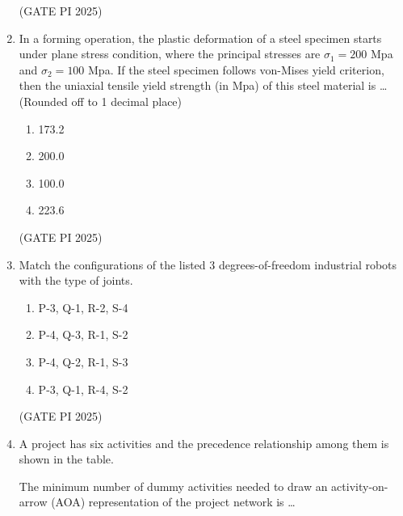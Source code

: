 \documentclass[journal,12pt,onecolumn]{IEEEtran}
\theoremstyle{remark}
\begin{document}
\begin{enumerate}
\hfill (GATE PI 2025)

\item In a forming operation, the plastic deformation of a steel specimen starts under plane stress condition, where the principal stresses are $\sigma_1=200$ Mpa and $\sigma_2=100$ Mpa. If the steel specimen follows von-Mises yield criterion, then the uniaxial tensile yield strength (in Mpa) of this steel material is \dots (Rounded off to 1 decimal place)

\begin{multicols}{4}
\begin{enumerate}
\item 173.2
\item 200.0
\item 100.0
\item 223.6
\end{enumerate}
\end{multicols}

\hfill (GATE PI 2025)

\item Match the configurations of the listed 3 degrees-of-freedom industrial robots with the type of joints.



\begin{enumerate}
\item P-3, Q-1, R-2, S-4
\item P-4, Q-3, R-1, S-2
\item P-4, Q-2, R-1, S-3
\item P-3, Q-1, R-4, S-2
\end{enumerate}


\hfill (GATE PI 2025)

\item A project has six activities and the precedence relationship among them is shown in the table.


 The minimum number of dummy activities needed to draw an activity-on-arrow (AOA) representation of the project network is \dots

\begin{enumerate}
\end{enumerate}


\end{enumerate}
\end{document}
